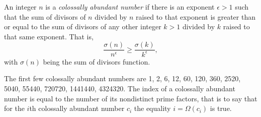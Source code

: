 \documentclass[12pt]{article}
\begin{document}
An integer $n$ is a {\em colossally abundant number} if there is an exponent $\epsilon > 1$ such that the sum of divisors of $n$ divided by $n$ raised to that exponent is greater than or equal to the sum of divisors of any other integer $k > 1$ divided by $k$ raised to that same exponent. That is, $$\frac{\sigma(n)}{n^\epsilon} \geq \frac{\sigma(k)}{k^\epsilon},$$ with $\sigma(n)$ being the sum of divisors function.

The first few colossally abundant numbers are 1, 2, 6, 12, 60, 120, 360, 2520, 5040, 55440, 720720, 1441440, 4324320. The index of a colossally abundant number is equal to the number of its nondistinct prime factors, that is to say that for the $i$th colossally abundant number $c_i$ the equality $i = \Omega(c_i)$ is true.
\end{document}
